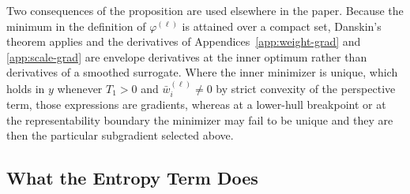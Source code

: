 \documentclass{article}
\begin{document}
Two consequences of the proposition are used elsewhere in the paper. Because the
minimum in the definition of $\varphi^{(\ell)}$ is attained over a compact set,
Danskin's theorem \citep{danskin1966maxmin} applies and the derivatives of
Appendices~\ref{app:weight-grad} and \ref{app:scale-grad} are envelope
derivatives at the inner optimum rather than derivatives of a smoothed surrogate.
Where the inner minimizer is unique, which holds in $y$ whenever $T_1>0$ and
$\bar w_i^{(\ell)}\neq0$ by strict convexity of the perspective term, those
expressions are gradients, whereas at a lower-hull breakpoint or at the
representability boundary the minimizer may fail to be unique and they are then
the particular subgradient selected above.


\subsection{What the Entropy Term Does}
\label{app:count-penalty}
\end{document}
